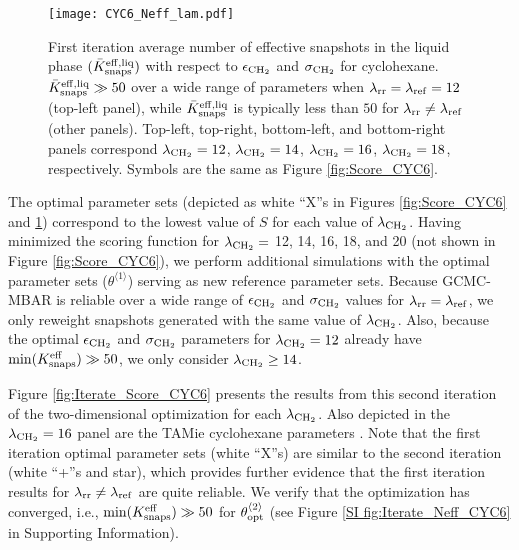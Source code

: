 \documentclass[journal=jced,manuscript=article]{achemso}
\begin{document}
	\begin{figure}[htb!]
		\centering
		\texttt{[image: CYC6\_Neff\_lam.pdf]}
		\caption{First iteration average number of effective snapshots in the liquid phase $(\bar K_{\rm snaps}^{\rm eff, liq})$ with respect to $\epsilon_{\rm CH_2}$ and $\sigma_{\rm CH_2}$ for cyclohexane. $\bar K_{\rm snaps}^{\rm eff, liq} \gg 50$ over a wide range of parameters when $\lambda_{\rm rr} = \lambda_{\rm ref} = 12$ (top-left panel), while $\bar K_{\rm snaps}^{\rm eff, liq}$ is typically less than $50$ for $\lambda_{\rm rr} \neq \lambda_{\rm ref}$ (other panels). Top-left, top-right, bottom-left, and bottom-right panels correspond $\lambda_{\rm CH_2} = 12$, $\lambda_{\rm CH_2} = 14$, $\lambda_{\rm CH_2} = 16$, $\lambda_{\rm CH_2} = 18$, respectively. Symbols are the same as Figure \ref{fig:Score_CYC6}.}%
		\label{fig:Neff_CYC6}
	\end{figure}

The optimal parameter sets (depicted as white ``X''s in Figures \ref{fig:Score_CYC6} and \ref{fig:Neff_CYC6}) correspond to the lowest value of $S$ for each value of $\lambda_{\rm CH_2}$. Having minimized the scoring function for $\lambda_{\rm CH_2} =$ 12, 14, 16, 18, and 20 (not shown in Figure \ref{fig:Score_CYC6}), we perform additional simulations with the optimal parameter sets ($\theta^{\langle1\rangle}$) serving as new reference parameter sets. Because GCMC-MBAR is reliable over a wide range of $\epsilon_{\rm CH_2}$ and $\sigma_{\rm CH_2}$ values for $\lambda_{\rm rr} = \lambda_{\rm ref}$, we only reweight snapshots generated with the same value of $\lambda_{\rm CH_2}$. Also, because the optimal $\epsilon_{\rm CH_2}$ and $\sigma_{\rm CH_2}$ parameters for $\lambda_{\rm CH_2} = 12$ already have $\min(K_{\rm snaps}^{\rm eff}) \gg 50$, we only consider $\lambda_{\rm CH_2} \ge 14$.


Figure \ref{fig:Iterate_Score_CYC6} presents the results from this second iteration of the two-dimensional optimization for each $\lambda_{\rm CH_2}$. Also depicted in the $\lambda_{\rm CH_2} = 16$ panel are the TAMie cyclohexane parameters \cite{Weidler2016}. Note that the first iteration optimal parameter sets (white ``X''s) are similar to the second iteration (white ``+''s and star), which provides further evidence that the first iteration results for $\lambda_{\rm rr} \neq \lambda_{\rm ref}$ are quite reliable. We verify that the optimization has converged, i.e., $\min(K_{\rm snaps}^{\rm eff}) \gg 50$ for $\theta_{\rm opt}^{\langle2\rangle}$ (see Figure \ref{SI fig:Iterate_Neff_CYC6} in Supporting Information).  
\end{document}

